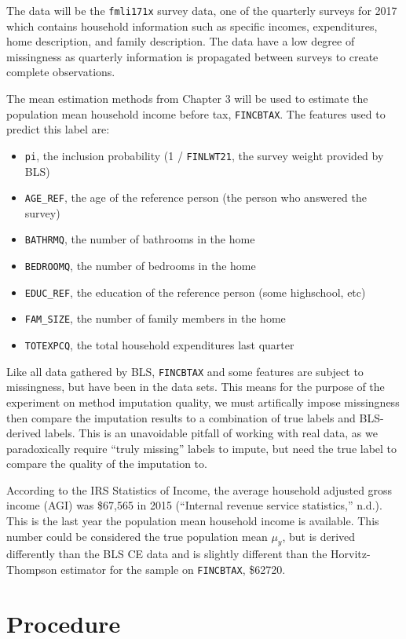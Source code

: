 \documentclass[12pt,twoside]{reedthesis}
\begin{document}
The data will be the \texttt{fmli171x} survey data, one of the quarterly
surveys for 2017 which contains household information such as specific
incomes, expenditures, home description, and family description. The
data have a low degree of missingness as quarterly information is
propagated between surveys to create complete observations.

The mean estimation methods from Chapter 3 will be used to estimate the
population mean household income before tax, \texttt{FINCBTAX}. The
features used to predict this label are:
\begin{itemize}
\item
  \texttt{pi}, the inclusion probability (1 / \texttt{FINLWT21}, the
  survey weight provided by BLS)
\item
  \texttt{AGE\_REF}, the age of the reference person (the person who
  answered the survey)
\item
  \texttt{BATHRMQ}, the number of bathrooms in the home
\item
  \texttt{BEDROOMQ}, the number of bedrooms in the home
\item
  \texttt{EDUC\_REF}, the education of the reference person (some
  highschool, etc)
\item
  \texttt{FAM\_SIZE}, the number of family members in the home
\item
  \texttt{TOTEXPCQ}, the total household expenditures last quarter
\end{itemize}
Like all data gathered by BLS, \texttt{FINCBTAX} and some features are
subject to missingness, but have been in the data sets. This means for
the purpose of the experiment on method imputation quality, we must
artifically impose missingness then compare the imputation results to a
combination of true labels and BLS-derived labels. This is an
unavoidable pitfall of working with real data, as we paradoxically
require ``truly missing'' labels to impute, but need the true label to
compare the quality of the imputation to.

According to the IRS Statistics of Income, the average household
adjusted gross income (AGI) was \$67,565 in 2015 (``Internal revenue
service statistics,'' n.d.). This is the last year the population mean
household income is available. This number could be considered the true
population mean \(\mu_y\), but is derived differently than the BLS CE
data and is slightly different than the Horvitz-Thompson estimator for
the sample on \texttt{FINCBTAX}, \$62720.

\section{Procedure}\label{procedure}
\end{document}
